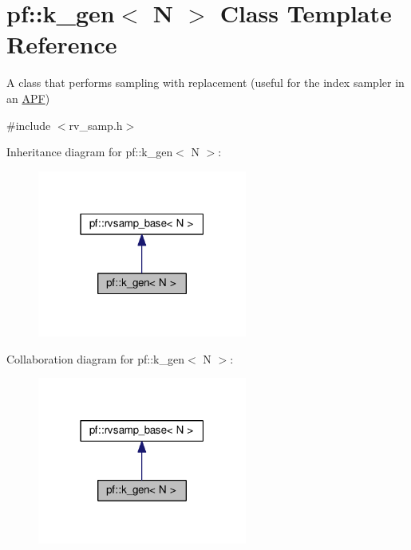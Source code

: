 \hypertarget{classpf_1_1k__gen}{}\section{pf\+:\+:k\+\_\+gen$<$ N $>$ Class Template Reference}
\label{classpf_1_1k__gen}


A class that performs sampling with replacement (useful for the index sampler in an \hyperlink{classpf_1_1APF}{A\+PF})  




{\ttfamily \#include $<$rv\+\_\+samp.\+h$>$}



Inheritance diagram for pf\+:\+:k\+\_\+gen$<$ N $>$\+:\nopagebreak
\begin{figure}[H]
\begin{center}
\leavevmode
\includegraphics[width=195pt]{classpf_1_1k__gen__inherit__graph}
\end{center}
\end{figure}


Collaboration diagram for pf\+:\+:k\+\_\+gen$<$ N $>$\+:\nopagebreak
\begin{figure}[H]
\begin{center}
\leavevmode
\includegraphics[width=195pt]{classpf_1_1k__gen__coll__graph}
\end{center}
\end{figure}

